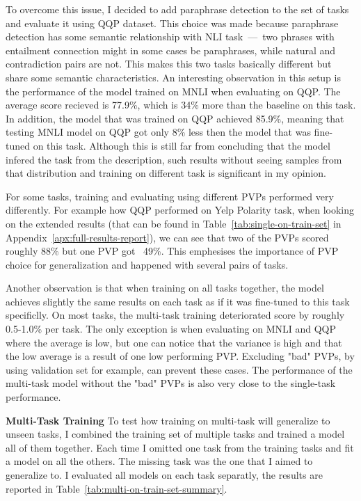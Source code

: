 \documentclass[11pt,a4paper]{article}
\begin{document}
To overcome this issue, I decided to add paraphrase detection to the set of tasks and evaluate it using QQP dataset.
This choice was made because paraphrase detection has some semantic relationship with NLI task~---~two phrases with entailment connection might in some cases be paraphrases, while natural and contradiction pairs are not.
This makes this two tasks basically different but share some semantic characteristics. 
An interesting observation in this setup is the performance of the model trained on MNLI when evaluating on QQP.
The average score recieved is 77.9\%, which is 34\% more than the baseline on this task.
In addition, the model that was trained on QQP achieved 85.9\%, meaning that testing MNLI model on QQP got only 8\% less then the model that was fine-tuned on this task.
Although this is still far from concluding that the model infered the task from the description, such results without seeing samples from that distribution and training on different task is significant in my opinion.

For some tasks, training and evaluating using different PVPs performed very differently.
For example how QQP performed on Yelp Polarity task, when looking on the extended results (that can be found in Table~\ref{tab:single-on-train-set} in Appendix~\ref{apx:full-results-report}), we can see that two of the PVPs scored roughly 88\% but one PVP got ~49\%.
This emphesises the importance of PVP choice for generalization and happened with several pairs of tasks.

Another observation is that when training on all tasks together, the model achieves slightly the same results on each task as if it was fine-tuned to this task specificlly.
On most tasks, the multi-task training deteriorated score by roughly 0.5-1.0\% per task.
The only exception is when evaluating on MNLI and QQP where the average is low, but one can notice that the variance is high and that the low average is a result of one low performing PVP.
Excluding "bad" PVPs, by using validation set for example, can prevent these cases.
The performance of the multi-task model without the "bad" PVPs is also very close to the single-task performance.

\vspace{8pt}
\noindent\textbf{Multi-Task Training}\quad
To test how training on multi-task will generalize to unseen tasks, I combined the training set of multiple tasks and trained a model all of them together.
Each time I omitted one task from the training tasks and fit a model on all the others.
The missing task was the one that I aimed to generalize to.
I evaluated all models on each task separatly, the results are reported in Table~\ref{tab:multi-on-train-set-summary}.
\end{document}
